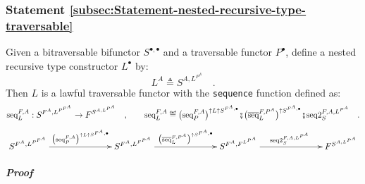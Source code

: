 \subsubsection{Statement \label{subsec:Statement-nested-recursive-type-traversable}\ref{subsec:Statement-nested-recursive-type-traversable}}

Given a bitraversable bifunctor $S^{\bullet,\bullet}$ and a traversable
functor $P^{\bullet}$, define a nested recursive type constructor
$L^{\bullet}$ by:
\[
L^{A}\triangleq S^{A,L^{P^{A}}}\quad.
\]
Then $L$ is a lawful traversable functor with the \lstinline!sequence!
function defined as:
\[
\text{seq}_{L}^{F,A}:S^{F^{A},L^{P^{F^{A}}}}\rightarrow F^{S^{A,L^{P^{A}}}}\quad,\quad\quad\text{seq}_{L}^{F,A}\triangleq\big(\text{seq}_{P}^{F,A}\big)^{\uparrow L\uparrow S^{F^{A},\bullet}}\bef\big(\overline{\text{seq}}_{L}^{F,P^{A}}\big)^{\uparrow S^{F^{A},\bullet}}\bef\text{seq2}_{S}^{F,A,L^{P^{A}}}\quad.
\]
\vspace{-1\baselineskip}
\[
\xymatrix{\xyScaleY{1.4pc}\xyScaleX{6pc}S^{F^{A},L^{P^{F^{A}}}}\ar[r]\sp(0.5){\big(\text{seq}_{P}^{F,A}\big)^{\uparrow L\uparrow S^{F^{A},\bullet}}} & S^{F^{A},L^{F^{P^{A}}}}\ar[r]\sp(0.5){\big(\overline{\text{seq}}_{L}^{F,P^{A}}\big)^{\uparrow S^{F^{A},\bullet}}} & S^{F^{A},F^{L^{P^{A}}}}\ar[r]\sp(0.5){\text{seq2}_{S}^{F,A,L^{P^{A}}}} & F^{S^{A,L^{P^{A}}}}}
\]
\vspace{-1\baselineskip}


\subparagraph{Proof}


